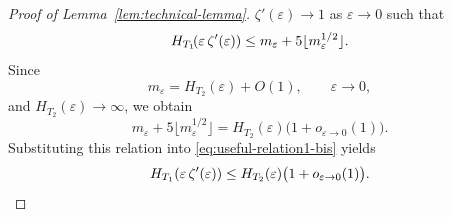 \documentclass[a4paper,12pt]{article}
\let\originalleft\left
\let\originalright\right
\renewcommand{\left}{\mathopen{}\mathclose\bgroup\originalleft}
\renewcommand{\right}{\aftergroup\egroup\originalright}
\newcommand{\N}{\mathbb{N}}
\newcommand{\R}{\mathbb{R}}
\begin{document}
\begin{proof}[Proof of Lemma~\ref{lem:technical-lemma}]
$\zeta'(\varepsilon)\to1$ as $\varepsilon\to0$ such that
\begin{equation}\label{eq:useful-relation1-bis}
    H_{T_1}\!\left(\varepsilon\,\zeta'(\varepsilon)\right)
    \le
    m_\varepsilon+5\lfloor m_\varepsilon^{1/2}\rfloor.
\end{equation}
Since
\[
m_\varepsilon
=
H_{T_2}(\varepsilon)+O(1),
\qquad \varepsilon\to0,
\]
and $H_{T_2}(\varepsilon)\to\infty$, we obtain
\[
m_\varepsilon+5\lfloor m_\varepsilon^{1/2}\rfloor
=
H_{T_2}(\varepsilon)\bigl(1+o_{\varepsilon\to0}(1)\bigr).
\]
Substituting this relation into \eqref{eq:useful-relation1-bis} yields
\begin{equation}\label{eq:asymp-upper}
    H_{T_1} \left(\varepsilon\,\zeta'(\varepsilon)\right)
\le
H_{T_2}(\varepsilon)\bigl(1+o_{\varepsilon\to0}(1)\bigr).
\end{equation}

\end{proof}
\end{document}
